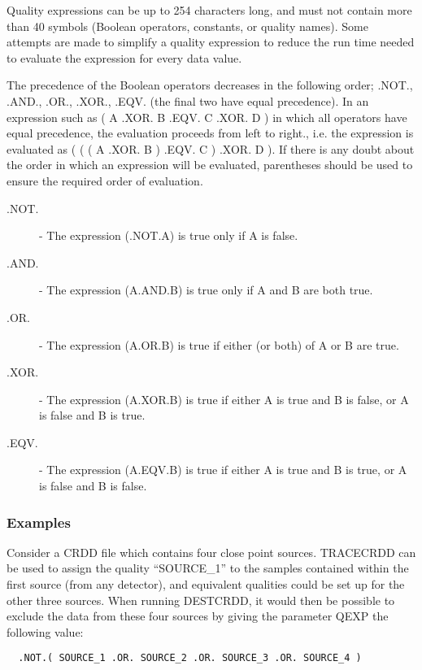 Quality expressions can be up to 254 characters long, and must
not contain more than 40 symbols (Boolean operators, constants,
or quality names). Some attempts are made to simplify a quality
expression to reduce the run time needed to evaluate the
expression for every data value.

The precedence of the Boolean  operators decreases in the following
order; .NOT., .AND., .OR., .XOR., .EQV. (the final two have equal 
precedence). In an expression such as ( A .XOR. B .EQV. C .XOR. D ) in
which all operators have equal precedence, the evaluation proceeds from
left to right., i.e. the expression is evaluated as ( ( ( A .XOR. B )
.EQV. C ) .XOR. D ). If there is any doubt about the order in which an
expression will be evaluated, parentheses should be used to ensure the
required order of evaluation. 

\begin{description}
\item [.NOT.] -
The expression (.NOT.A) is true only if A is false.

\item [.AND.] -
The expression (A.AND.B) is true only if A and B are both true.

\item [.OR.] -
The expression (A.OR.B) is true if either (or both) of A or B are
true. 

\item [.XOR.] -
The expression (A.XOR.B) is true if either A is true and B is
false, or A is false and B is true. 

\item [.EQV.] -
The expression (A.EQV.B) is true if either A is true and B is
true, or A is false and B is false. 
\end{description}

\subsubsection{Examples}
Consider a {\small CRDD} file which contains four close point sources.
{\small TRACECRDD} can be  used to assign the quality ``SOURCE\_1'' to
the samples contained within the  first source (from any
detector), and equivalent qualities could be set up for the other three
sources. When running {\small DESTCRDD}, it would then be possible to
exclude the data from these four sources by giving the parameter
{\small QEXP} the following value: 

\small
\begin{verbatim}
  .NOT.( SOURCE_1 .OR. SOURCE_2 .OR. SOURCE_3 .OR. SOURCE_4 )
\end{verbatim}
\normalsize

